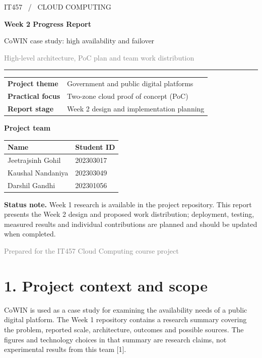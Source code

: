 \documentclass[11pt,a4paper]{article}
\newcommand{\sectionline}[1]{\section*{\color{navy}#1}}
\begin{document}
\thispagestyle{empty}
{\color{teal}\large IT457 \ / \ CLOUD COMPUTING}\par\vspace{10mm}
{\color{navy}\LARGE\bfseries Week 2 Progress Report}\par\vspace{3mm}
{\Large CoWIN case study: high availability and failover}\par\vspace{5mm}
\textcolor{graytext}{High-level architecture, PoC plan and team work distribution}\par
\vspace{8mm}\hrule\vspace{7mm}
\begin{tabularx}{\textwidth}{@{}lY@{}}
\textbf{Project theme} & Government and public digital platforms \\
\textbf{Practical focus} & Two-zone cloud proof of concept (PoC) \\
\textbf{Report stage} & Week 2 design and implementation planning \\
\end{tabularx}
\par\vspace{8mm}
\textbf{Project team}\par
\begin{tabularx}{\textwidth}{@{}Yl@{}}\toprule
\textbf{Name} & \textbf{Student ID}\\\midrule
Jeetrajsinh Gohil & 202303017\\
Kaushal Nandaniya & 202303049\\
Darshil Gandhi & 202301056\\\bottomrule
\end{tabularx}
\par\vspace{6mm}
\colorbox{pale}{\parbox{\dimexpr\textwidth-2\fboxsep\relax}{\textbf{Status note.} Week 1 research is available in the project repository. This report presents the Week 2 design and proposed work distribution; deployment, testing, measured results and individual contributions are planned and should be updated when completed.}}
\vfill
\textcolor{graytext}{Prepared for the IT457 Cloud Computing course project}\par
\newpage
\sectionline{1. Project context and scope}
CoWIN is used as a case study for examining the availability needs of a public digital platform. The Week 1 repository contains a research summary covering the problem, reported scale, architecture, outcomes and possible sources. The figures and technology choices in that summary are research claims, not experimental results from this team [1].
\end{document}
